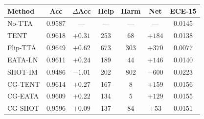 \footnotesize
\setlength{\tabcolsep}{2.5pt}
\begin{tabular}{lcccccc}
\toprule
Method & Acc & $\Delta$Acc & Help & Harm & Net & ECE-15 \\
\midrule
No-TTA & 0.9587 & --- & --- & --- & --- & 0.0145 \\
TENT & 0.9618 & $+0.31$ & 253 & 68 & $+184$ & 0.0138 \\
Flip-TTA & 0.9649 & $+0.62$ & 673 & 303 & $+370$ & 0.0077 \\
EATA-LN & 0.9611 & $+0.24$ & 189 & 44 & $+146$ & 0.0140 \\
SHOT-IM & 0.9486 & $-1.01$ & 202 & 802 & $-600$ & 0.0223 \\
\midrule
CG-TENT & 0.9614 & $+0.27$ & 167 & 8 & $+159$ & 0.0156 \\
CG-EATA & 0.9609 & $+0.22$ & 134 & 5 & $+129$ & 0.0155 \\
CG-SHOT & 0.9596 & $+0.09$ & 137 & 84 & $+53$ & 0.0151 \\
\bottomrule
\end{tabular}
